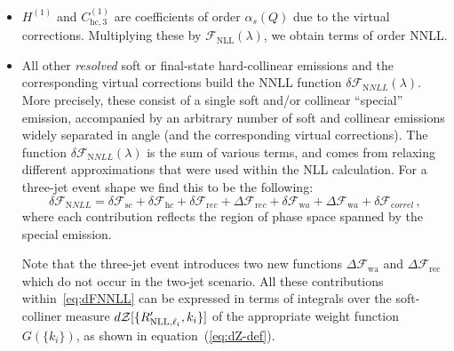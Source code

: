 \begin{itemize}
\item $H^{(1)}$ and $C_{\mathrm{hc},3}^{(1)}$ are coefficients of order $\alpha_s(Q)$ due to the virtual corrections. Multiplying these by $\mathcal{F}_{\mathrm{NLL}}(\lambda)$, we obtain terms of order NNLL. 

\item All other \emph{resolved} soft or final-state hard-collinear emissions and the corresponding virtual corrections build the NNLL function
  $\delta\mathcal{F}_{\mathrm NNLL}(\lambda)$. More precisely, these
  consist of a single soft and/or collinear ``special'' emission,
  accompanied by an arbitrary number of soft and collinear emissions
  widely separated in angle (and the corresponding virtual
  corrections). The function $\delta\mathcal{F}_{\mathrm NNLL}(\lambda)$
  is the sum of various terms, and comes from relaxing different approximations that were used within the NLL calculation. %
  For a three-jet event shape we find this to be the following:
\begin{equation}
    \label{eq:dFNNLL}
    \delta\mathcal{F}_{\mathrm NNLL} = \delta\mathcal{F}_{\mathrm sc}+\delta\mathcal{F}_{\mathrm hc}+\delta\mathcal{F}_{\mathrm rec}+\Delta\mathcal{F}_{\mathrm rec}+\delta\mathcal{F}_{\mathrm wa}+\Delta\mathcal{F}_{\mathrm wa}+\delta\mathcal{F}_{\mathrm correl}\,,
\end{equation}
where each contribution reflects the region of phase space spanned by the special emission.%

Note that the three-jet event introduces two new functions $\Delta\mathcal{F}_{\mathrm{wa}}$ and $\Delta\mathcal{F}_{\mathrm{rec}}$ which do not occur in the two-jet scenario. All these contributions within~\ref{eq:dFNNLL} can be expressed in terms of integrals over the soft-colliner measure $d{\mathcal Z}[\{R'_{\mathrm{NLL}, \ell_i}, k_i\}]$ of the appropriate weight function $G(\{k_i\})$, as shown in equation~(\ref{eq:dZ-def}). 
\end{itemize}


